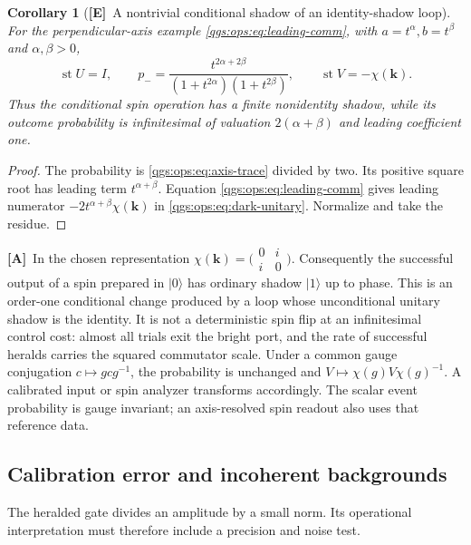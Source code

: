 \documentclass[11pt,oneside]{article}
\numberwithin{equation}{section}
\theoremstyle{plain}
\newtheorem{corollary}[corollary]{Corollary}
\theoremstyle{definition}
\theoremstyle{remark}
\newcommand{\qk}{\mathbf k}
\DeclareMathOperator{\st}{st}
\newcommand{\ket}[1]{\lvert#1\rangle}
\newcommand{\TE}{\textcolor{TierE}{\textsf{\bfseries[E]}}}
\newcommand{\TA}{\textcolor{TierA}{\textsf{\bfseries[A]}}}
\begin{document}
\begin{corollary}[\TE\ A nontrivial conditional shadow of an identity-shadow loop]\label{qgs:ops:cor:dark-limit}
For the perpendicular-axis example \eqref{qgs:ops:eq:leading-comm}, with $a=t^\alpha,b=t^\beta$ and $\alpha,\beta>0$,
\begin{equation}\label{qgs:ops:eq:dark-example}
 \st U=I,\qquad
 p_-=\frac{t^{2\alpha+2\beta}}
              {(1+t^{2\alpha})(1+t^{2\beta})},\qquad
 \st V=-\chi(\qk).
\end{equation}
Thus the conditional spin operation has a finite nonidentity shadow, while its outcome probability is infinitesimal of valuation $2(\alpha+\beta)$ and leading coefficient one.
\end{corollary}
\begin{proof}
The probability is \eqref{qgs:ops:eq:axis-trace} divided by two. Its positive square root has leading term $t^{\alpha+\beta}$. Equation \eqref{qgs:ops:eq:leading-comm} gives leading numerator $-2t^{\alpha+\beta}\chi(\qk)$ in \eqref{qgs:ops:eq:dark-unitary}. Normalize and take the residue.
\end{proof}

\TA\ In the chosen representation $\chi(\qk)=\bigl(\begin{smallmatrix}0&i\\i&0\end{smallmatrix}\bigr)$. Consequently the successful output of a spin prepared in $\ket0$ has ordinary shadow $\ket1$ up to phase. This is an order-one conditional change produced by a loop whose unconditional unitary shadow is the identity. It is not a deterministic spin flip at an infinitesimal control cost: almost all trials exit the bright port, and the rate of successful heralds carries the squared commutator scale. Under a common gauge conjugation $c\mapsto gcg^{-1}$, the probability is unchanged and $V\mapsto\chi(g)V\chi(g)^{-1}$. A calibrated input or spin analyzer transforms accordingly. The scalar event probability is gauge invariant; an axis-resolved spin readout also uses that reference data.

\subsection{Calibration error and incoherent backgrounds}
The heralded gate divides an amplitude by a small norm. Its operational interpretation must therefore include a precision and noise test.
\end{document}
